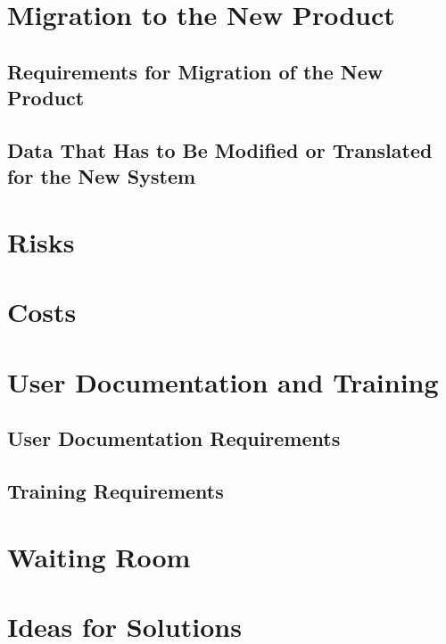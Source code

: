 \documentclass{scrreprt}
\begin{document}
\section{Migration to the New Product}

\subsection{Requirements for Migration of the New Product}

\subsection{Data That Has to Be Modified or Translated for the New
            System}

\section{Risks}

\section{Costs}

\section{User Documentation and Training}

\subsection{User Documentation Requirements}

\subsection{Training Requirements}

\section{Waiting Room}

\section{Ideas for Solutions}


 
\end{document}
